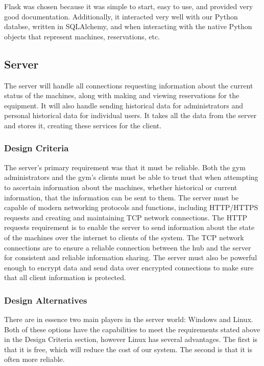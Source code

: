 \documentclass[PPFS.tex]{template/subfiles}
\begin{document}
Flask was chosen because it was simple to start, easy to use, and provided very good documentation. Additionally, it interacted very well with our Python databse, written in SQLAlchemy, and when interacting with the native Python objects that represent machines, reservations, etc.
\subsection{Server}
The server will handle all connections requesting information about the current status of the machines, along with making and viewing reservations for the equipment. It will also handle sending historical data for administrators and personal historical data for individual users. It takes all the data from the server and stores it, creating these services for the client.

\subsubsection{Design Criteria}
The server's primary requirement was that it must be reliable. Both the gym administrators and the gym's clients must be able to trust that when attempting to ascertain information about the machines, whether historical or current information, that the information can be sent to them. The server must be capable of modern networking protocols and functions, including HTTP/HTTPS requests and creating and maintaining TCP network connections. The HTTP requests requirement is to enable the server to send information about the state of the machines over the internet to clients of the system. The TCP network connections are to ensure a reliable connection between the hub and the server for consistent and reliable information sharing. The server must also be powerful enough to encrypt data and send data over encrypted connections to make sure that all client information is protected.

\subsubsection{Design Alternatives}
There are in essence two main players in the server world: Windows and Linux. Both of these options have the capabilities to meet the requirements stated above in the Design Criteria section, however Linux has several advantages. The first is that it is free, which will reduce the cost of our system. The second is that it is often more
reliable.
\end{document}
